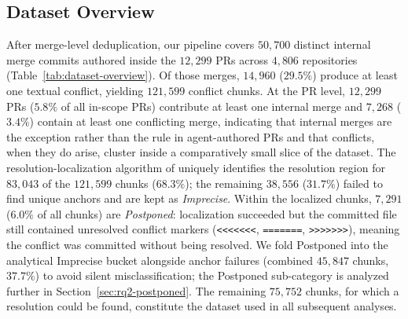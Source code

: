 \documentclass[sigconf,anonymous]{acmart}
\begin{document}
\subsection{Dataset Overview}
\label{sec:res-overview}

After merge-level deduplication, our pipeline covers $50{,}700$ distinct internal merge commits authored inside the $12{,}299$ PRs across $4{,}806$ repositories (Table~\ref{tab:dataset-overview}). Of those merges, $14{,}960$ ($29.5\%$) produce at least one textual conflict, yielding $121{,}599$ conflict chunks. At the PR level, $12{,}299$ PRs ($5.8\%$ of all in-scope PRs) contribute at least one internal merge and $7{,}268$ ($3.4\%$) contain at least one conflicting merge, indicating that internal merges are the exception rather than the rule in agent-authored PRs and that conflicts, when they do arise, cluster inside a comparatively small slice of the dataset. The resolution-localization algorithm of \citet{dinella2022deepmerge} uniquely identifies the resolution region for $83{,}043$ of the $121{,}599$ chunks ($68.3\%$); the remaining $38{,}556$ ($31.7\%$) failed to find unique anchors and are kept as \emph{Imprecise}. Within the localized chunks, $7{,}291$ ($6.0\%$ of all chunks) are \emph{Postponed}: localization succeeded but the committed file still contained unresolved conflict markers (\verb|<<<<<<<|, \verb|=======|, \verb|>>>>>>>|), meaning the conflict was committed without being resolved. We fold Postponed into the analytical Imprecise bucket alongside anchor failures (combined $45{,}847$ chunks, $37.7\%$) to avoid silent misclassification; the Postponed sub-category is analyzed further in Section~\ref{sec:rq2-postponed}.  The remaining $75{,}752$ chunks, for which a resolution could be found, constitute the dataset used in all subsequent analyses.
\end{document}
